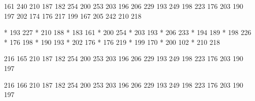   161 240
  210 187
  182 254
  200 253
  203 196
  206 229
  193 249
  198 223
  176 203
  190 197
  202 174
  176 217
  199 167
  205 242
  210 218

* 193 227
* 210 188
* 183 161
* 200 254
* 203 193
* 206 233
* 194 189
* 198 226
* 176 198
* 190 193
* 202 176
* 176 219
* 199 170
* 200 102
* 210 218

  216 165
  210 187
  182 254
  200 253
  203 196
  206 229
  193 249
  198 223
  176 203
  190 197

  216 166
  210 187
  182 254
  200 253
  203 196
  206 229
  193 249
  198 223
  176 203
  190 197

\stopencoding

\endinput
